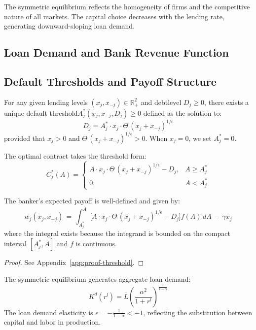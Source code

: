 \documentclass[12pt]{article}
\begin{document}
The symmetric equilibrium reflects the homogeneity of firms and the competitive nature of all markets. The capital choice decreases with the lending rate, generating downward-sloping loan demand.

\subsection{Loan Demand and Bank Revenue Function}
\subsection{Default Thresholds and Payoff Structure}
\begin{proposition}\label{prop:threshold}
For any given lending levels $(x_j, x_{-j}) \in \mathbb{R}_+^2$ and debt\Allow level $D_j \geq 0$, there exists a unique default threshold\Allow $A_j^*(x_j, x_{-j}, D_j) \geq 0$ defined as the solution to:
\begin{equation}
    D_j = A_j^* \cdot x_j \cdot \Theta\,(x_j + x_{-j})^{1/\epsilon}
\end{equation}
provided that $x_j > 0$ and $\Theta\,(x_j + x_{-j})^{1/\epsilon} > 0$. When $x_j = 0$, we set $A_j^* = 0$.

The optimal contract takes the threshold form:
\begin{equation}
C_{j}^{*}(A) = \begin{cases}
A \cdot x_{j} \cdot \Theta\,(x_{j}+x_{-j})^{1/\epsilon} - D_{j}, & A \ge A_{j}^{*} \\
0, & A < A_{j}^{*}
\end{cases}
\end{equation}

The banker's expected payoff is well-defined and given by:
\begin{equation}
    w_{j}(x_{j},x_{-j}) \,=\, \int_{A_{j}^{*}}^{\overline{A}} \big[ A \cdot x_{j} \cdot \Theta\,(x_{j}+x_{-j})^{1/\epsilon} - D_{j} \big] f(A)\,dA \, - \, \gamma x_{j}
\end{equation}
where the integral exists because the integrand is bounded on the compact interval $[A_j^*, \overline{A}]$ and $f$ is continuous.
\end{proposition}

\begin{proof}
See Appendix~\ref{app:proof-threshold}.
\end{proof}

The symmetric equilibrium generates aggregate loan demand:
\begin{equation}
    K^{d}(r^{l}) = \overline{L}\left(\frac{\alpha^{2}}{1+r^{l}}\right)^{\frac{1}{1-\alpha}}
\end{equation}
The loan demand elasticity is $\epsilon = -\frac{1}{1-\alpha} < -1$, reflecting the substitution between capital and labor in production. 
\end{document}
